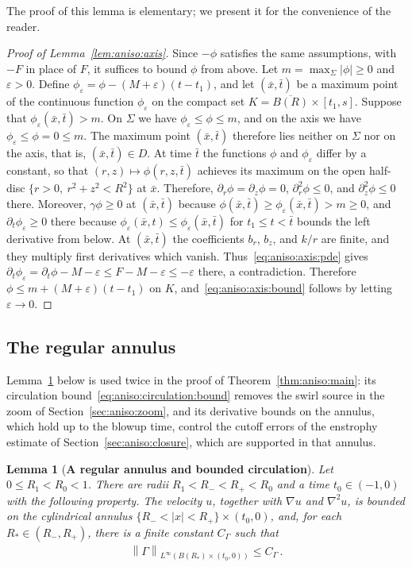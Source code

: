\documentclass[11pt,reqno]{amsproc}
\numberwithin{equation}{section}
\newtheorem{lemma}[theorem]{Lemma}
\theoremstyle{remark}
\newcommand{\p}{\partial}
\newcommand{\norm}[1]{\left\|#1\right\|}
\newcommand{\eps}{\varepsilon}
\begin{document}
The proof of this lemma is elementary; we present it for the convenience of the reader.

\begin{proof}[Proof of Lemma~\ref{lem:aniso:axis}]
Since $-\phi$ satisfies the same assumptions, with $-F$ in place of $F$, it suffices to bound $\phi$ from above. Let $m=\max_{\Sigma}|\phi|\ge0$ and $\eps>0$. Define $\phi_\eps=\phi-(M+\eps)(t-t_1)$, and let $(\bar x,\bar t)$ be a maximum point of the continuous function $\phi_\eps$ on the compact set $K=\overline{B(R)}\times[t_1,s]$. Suppose that $\phi_\eps(\bar x,\bar t)>m$. On $\Sigma$ we have $\phi_\eps\le\phi\le m$, and on the axis we have $\phi_\eps\le\phi=0\le m$. The maximum point $(\bar x,\bar t)$ therefore lies neither on $\Sigma$ nor on the axis, that is, $(\bar x,\bar t)\in D$. At time $\bar t$ the functions $\phi$ and $\phi_\eps$ differ by a constant, so that $(r,z)\mapsto\phi(r,z,\bar t)$ achieves its  maximum on the open half-disc $\{r>0,\ r^2+z^2<R^2\}$ at $\bar x$. Therefore, $\p_r\phi=\p_z\phi=0$, $\p_r^2\phi\le0$, and $\p_z^2\phi\le0$ there. Moreover, $\gamma\phi\ge0$ at $(\bar x,\bar t)$ because $\phi(\bar x,\bar t)\ge\phi_\eps(\bar x,\bar t)>m\ge0$, and $\p_t\phi_\eps\ge0$ there because $\phi_\eps(\bar x,t)\le\phi_\eps(\bar x,\bar t)$ for $t_1\le t<\bar t$ bounds the left derivative from below. At $(\bar x,\bar t)$ the coefficients $b_r$, $b_z$, and $k/r$ are finite, and they multiply first derivatives which vanish. Thus~\eqref{eq:aniso:axis:pde} gives $\p_t\phi_\eps=\p_t\phi-M-\eps\le F-M-\eps\le-\eps$ there, a contradiction. Therefore $\phi\le m+(M+\eps)(t-t_1)$ on $K$, and~\eqref{eq:aniso:axis:bound} follows by letting $\eps\to0$.
\end{proof}


\subsection{The regular annulus}
\label{sec:aniso:regular}
Lemma~\ref{lem:aniso:annulus} below is used twice in the proof of Theorem~\ref{thm:aniso:main}: its circulation bound~\eqref{eq:aniso:circulation:bound} removes the swirl source in the zoom of Section~\ref{sec:aniso:zoom}, and its derivative bounds on the annulus, which hold up to the blowup time, control the cutoff errors of the enstrophy estimate of Section~\ref{sec:aniso:closure}, which are supported in that annulus.

\begin{lemma}[{\bf A regular annulus and bounded circulation}]
\label{lem:aniso:annulus}
Let $0\le R_1<R_0<1$. There are radii $R_1<R_-<R_+<R_0$ and a time $t_0\in(-1,0)$ with the following property. The velocity $u$, together with $\nabla u$ and $\nabla^2u$, is bounded on the cylindrical annulus $\{R_-<|x|<R_+\}\times(t_0,0)$, and, for each $R_*\in(R_-,R_+)$, there is a finite constant $C_\Gamma$ such that 
\begin{align}
\norm{\Gamma}_{L^\infty(B(R_*)\times(t_0,0))}\le C_\Gamma
\,.
\label{eq:aniso:circulation:bound}
\end{align}
\end{lemma}
\end{document}

